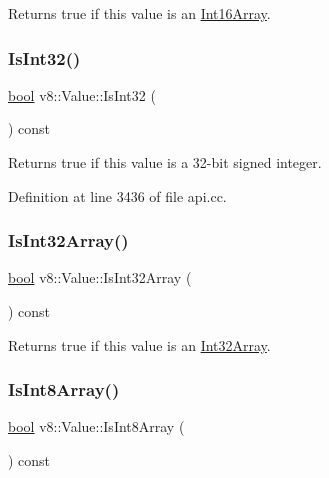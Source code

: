 Returns true if this value is an \mbox{\hyperlink{classv8_1_1Int16Array}{Int16\+Array}}. \mbox{\label{classv8_1_1Value_ad5d58df1d978b4d9875eb97b3bebfc29}} 
\subsubsection{\texorpdfstring{Is\+Int32()}{IsInt32()}}
{\footnotesize\ttfamily \mbox{\hyperlink{classbool}{bool}} v8\+::\+Value\+::\+Is\+Int32 (\begin{DoxyParamCaption}{ }\end{DoxyParamCaption}) const}

Returns true if this value is a 32-\/bit signed integer. 

Definition at line 3436 of file api.\+cc.

\mbox{\label{classv8_1_1Value_afd14729579f9768a7d3f8bc3db6c1d28}} 
\subsubsection{\texorpdfstring{Is\+Int32\+Array()}{IsInt32Array()}}
{\footnotesize\ttfamily \mbox{\hyperlink{classbool}{bool}} v8\+::\+Value\+::\+Is\+Int32\+Array (\begin{DoxyParamCaption}{ }\end{DoxyParamCaption}) const}

Returns true if this value is an \mbox{\hyperlink{classv8_1_1Int32Array}{Int32\+Array}}. \mbox{\label{classv8_1_1Value_ad9c2858387a0cafe3628f0533a9bbf6a}} 
\subsubsection{\texorpdfstring{Is\+Int8\+Array()}{IsInt8Array()}}
{\footnotesize\ttfamily \mbox{\hyperlink{classbool}{bool}} v8\+::\+Value\+::\+Is\+Int8\+Array (\begin{DoxyParamCaption}{ }\end{DoxyParamCaption}) const}

